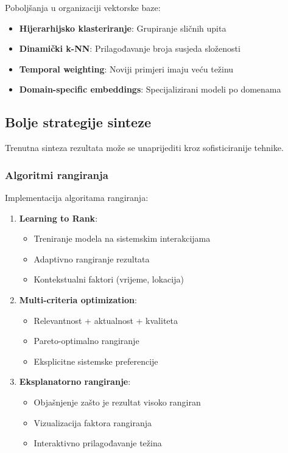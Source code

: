 Poboljšanja u organizaciji vektorske baze:

\begin{itemize}
    \item \textbf{Hijerarhijsko klasteriranje}: Grupiranje sličnih upita
    \item \textbf{Dinamički k-NN}: Prilagođavanje broja susjeda složenosti
    \item \textbf{Temporal weighting}: Noviji primjeri imaju veću težinu
    \item \textbf{Domain-specific embeddings}: Specijalizirani modeli po domenama
\end{itemize}

\subsection{Bolje strategije sinteze}

Trenutna sinteza rezultata može se unaprijediti kroz sofisticiranije tehnike.

\subsubsection{Algoritmi rangiranja}

Implementacija algoritama rangiranja:

\begin{enumerate}
    \item \textbf{Learning to Rank}:
    \begin{itemize}
        \item Treniranje modela na sistemskim interakcijama
        \item Adaptivno rangiranje rezultata
        \item Kontekstualni faktori (vrijeme, lokacija)
    \end{itemize}
    
    \item \textbf{Multi-criteria optimization}:
    \begin{itemize}
        \item Relevantnost + aktualnost + kvaliteta
        \item Pareto-optimalno rangiranje
        \item Eksplicitne sistemske preferencije
    \end{itemize}
    
    \item \textbf{Eksplanatorno rangiranje}:
    \begin{itemize}
        \item Objašnjenje zašto je rezultat visoko rangiran
        \item Vizualizacija faktora rangiranja
        \item Interaktivno prilagođavanje težina
    \end{itemize}
\end{enumerate}

